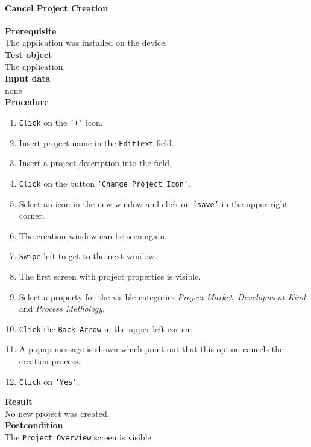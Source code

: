 \paragraph*{\textbf{Cancel Project Creation}}
\textbf{Prerequisite}\\
The application was installed on the device.\\
\textbf{Test object}\\
The application.\\
\textbf{Input data}\\
none\\
\textbf{Procedure}
\begin{enumerate}
	\item \texttt{Click} on the \texttt{'+'} icon.
	\item Insert project name in the \texttt{EditText} field.
	\item Insert a project description into the field.
	\item \texttt{Click} on the button \texttt{'Change Project Icon'}.
	\item Select an icon in the new window and click on \texttt{'save'} in the upper right corner.
	\item The creation window can be seen again.
	\item \texttt{Swipe} left to get to the next window.
	\item The first screen with project properties is visible.
	\item Select a property for the visible categories \textit{Project Market}, \textit{Development Kind} and \textit{Process Methology}.
	\item \texttt{Click} the \texttt{Back Arrow} in the upper left corner.
	\item A popup message is shown which point out that this option cancels the creation process.
	\item \texttt{Click} on \texttt{'Yes'}.
\end{enumerate}
\textbf{Result}\\
No new project was created.\\
\textbf{Postcondition}\\
The \texttt{Project Overview} screen is visible.